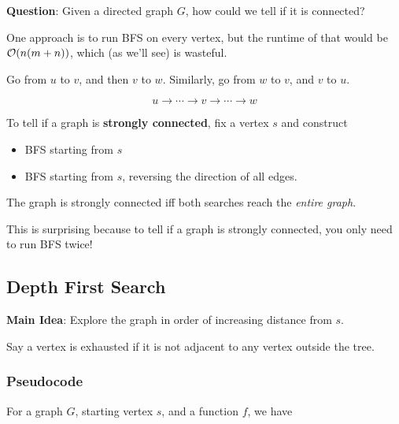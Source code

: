 \documentclass[12pt]{article}
\begin{document}
  {\bf Question}: Given a directed graph $G$, how could we tell if it is
  connected?

  One approach is to run BFS on every vertex, but the runtime of that would be
  $\mathcal O(n(m + n))$, which (as we'll see) is wasteful.

  {
    Go from $u$ to $v$, and then $v$ to $w$. Similarly, go from $w$ to $v$, and
    $v$ to $u$.

    \[
      u \to \cdots \to v \to \cdots \to w
    \]
  }

  To tell if a graph is {\bf strongly connected}, fix a vertex $s$ and construct

  \begin{itemize}
    \item BFS starting from $s$
    \item BFS starting from $s$, reversing the direction of all edges.
  \end{itemize}

  The graph is strongly connected iff both searches reach the {\it entire graph}.


  This is surprising because to tell if a graph is strongly connected, you only
  need to run BFS twice!





  \subsection{Depth First Search}

  {\bf Main Idea}: Explore the graph in order of increasing distance from $s$.

  Say a vertex is exhausted if it is not adjacent to any vertex outside the tree.

  \subsubsection{Pseudocode}

  For a graph $G$, starting vertex $s$, and a function $f$, we have
\end{document}
